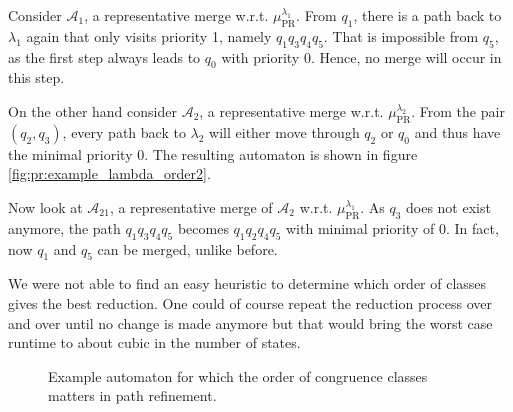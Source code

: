 Consider $\mathcal{A}_1$, a representative merge w.r.t. $\mu_\text{PR}^{\lambda_1}$. From $q_1$, there is a path back to $\lambda_1$ again that only visits priority 1, namely $q_1 q_3 q_4 q_5$. That is impossible from $q_5$, as the first step always leads to $q_0$ with priority 0. Hence, no merge will occur in this step.

On the other hand consider $\mathcal{A}_2$, a representative merge w.r.t. $\mu_\text{PR}^{\lambda_2}$. From the pair $(q_2, q_3)$, every path back to $\lambda_2$ will either move through $q_2$ or $q_0$ and thus have the minimal priority 0. The resulting automaton is shown in figure \ref{fig:pr:example_lambda_order2}.

Now look at $\mathcal{A}_{21}$, a representative merge of $\mathcal{A}_2$ w.r.t. $\mu_\text{PR}^{\lambda_1}$. As $q_3$ does not exist anymore, the path $q_1 q_3 q_4 q_5$ becomes $q_1 q_2 q_4 q_5$ with minimal priority of 0. In fact, now $q_1$ and $q_5$ can be merged, unlike before.

We were not able to find an easy heuristic to determine which order of classes gives the best reduction. One could of course repeat the reduction process over and over until no change is made anymore but that would bring the worst case runtime to about cubic in the number of states.


\begin{figure}
\centering
{}
\caption{Example automaton for which the order of congruence classes matters in path refinement.}
\label{fig:pr:example_lambda_order}
\end{figure}


